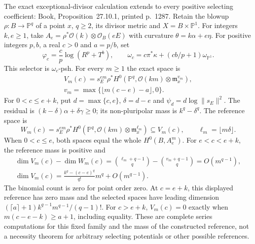 \documentclass[11pt]{article}
\begin{document}
The exact exceptional-divisor calculation extends to every positive selecting coefficient: Book, Proposition~27.10.1, printed p.~1287. Retain the blowup $\rho:B\to\mathbb P^q$ of a point $x$, $q\geq2$, its divisor metric and $X=B\times\mathbb P^1$. For integers $k,e\geq1$, take $A_e=\rho^*\mathcal O(k)\otimes\mathcal O_B(eE)$ with curvature $\theta=k\alpha+e\eta$. For positive integers $p,b$, a real $c>0$ and $a=p/b$, set
\[
 \varphi_c=\frac cp\log(R^p+T^b),\qquad
 \omega_c=c\pi^*\kappa+(cb/p+1)\omega_{\mathbb P^1}.
\]
This selector is $\omega_c$-psh. For every $m\geq1$ the exact space is
\[
 \begin{gathered}
 V_m(c)=s_E^{em}\rho^*H^0(\mathbb P^q,\mathcal O(km)\otimes\mathfrak m_x^{v_m}),\\
 v_m=\max\{\lfloor m(c-e)-a\rfloor,0\}.
 \end{gathered}
\]
For $0<c\leq e+k$, put $d=\max\{c,e\}$, $\delta=d-e$ and $\psi_d=d\log\|s_E\|^2$. The residual is $(k-\delta)\alpha+\delta\gamma\geq0$; its non-pluripolar mass is $k^q-\delta^q$. The reference space is
\[
 W_m(c)=s_E^{em}\rho^*H^0(\mathbb P^q,\mathcal O(km)\otimes\mathfrak m_x^{\ell_m})
 \subseteq V_m(c),\qquad \ell_m=\lfloor m\delta\rfloor.
\]
When $0<c\leq e$, both spaces equal the whole $H^0(B,A_e^m)$. For $e<c<e+k$, the reference mass is positive and
\[
 \begin{gathered}
 \dim V_m(c)-\dim W_m(c)
  =\binom{\ell_m+q-1}{q}-\binom{v_m+q-1}{q}=O(m^{q-1}),\\
 \dim V_m(c)=\frac{k^q-(c-e)^q}{q!}m^q+O(m^{q-1}).
 \end{gathered}
\]
The binomial count is zero for point order zero. At $c=e+k$, this displayed reference has zero mass and the selected spaces have leading dimension $(\lceil a\rceil+1)k^{q-1}m^{q-1}/(q-1)!$. For $c>e+k$, $V_m(c)=0$ exactly when $m(c-e-k)\geq a+1$, including equality. These are complete series computations for this fixed family and the mass of the constructed reference, not a necessity theorem for arbitrary selecting potentials or other possible references.
\end{document}
